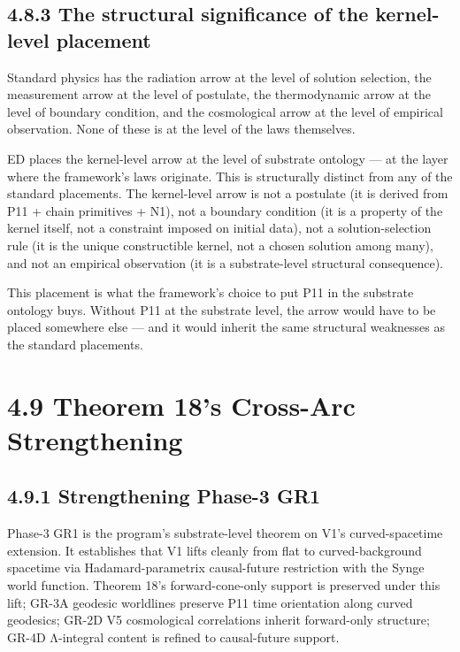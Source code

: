 \documentclass[11pt]{book}
\begin{document}
\subsection{4.8.3 The structural significance of the kernel-level placement}

Standard physics has the radiation arrow at the level of solution selection, the measurement arrow at the level of postulate, the thermodynamic arrow at the level of boundary condition, and the cosmological arrow at the level of empirical observation. None of these is at the level of the laws themselves.

ED places the kernel-level arrow at the level of substrate ontology — at the layer where the framework's laws originate. This is structurally distinct from any of the standard placements. The kernel-level arrow is not a postulate (it is derived from P11 + chain primitives + N1), not a boundary condition (it is a property of the kernel itself, not a constraint imposed on initial data), not a solution-selection rule (it is the unique constructible kernel, not a chosen solution among many), and not an empirical observation (it is a substrate-level structural consequence).

This placement is what the framework's choice to put P11 in the substrate ontology buys. Without P11 at the substrate level, the arrow would have to be placed somewhere else — and it would inherit the same structural weaknesses as the standard placements.

\section{4.9 Theorem 18's Cross-Arc Strengthening}

\subsection{4.9.1 Strengthening Phase-3 GR1}

Phase-3 GR1 is the program's substrate-level theorem on V1's curved-spacetime extension. It establishes that V1 lifts cleanly from flat to curved-background spacetime via Hadamard-parametrix causal-future restriction with the Synge world function. Theorem 18's forward-cone-only support is preserved under this lift; GR-3A geodesic worldlines preserve P11 time orientation along curved geodesics; GR-2D V5 cosmological correlations inherit forward-only structure; GR-4D Λ-integral content is refined to causal-future support.
\end{document}
